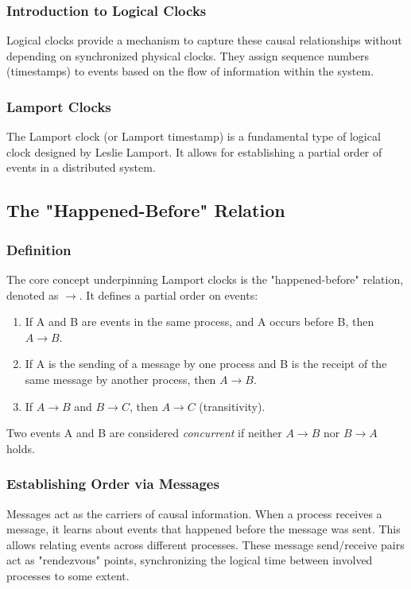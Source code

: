 \subsubsection{Introduction to Logical Clocks}
Logical clocks provide a mechanism to capture these causal relationships without depending on synchronized physical clocks. They assign sequence numbers (timestamps) to events based on the flow of information within the system.

\subsubsection{Lamport Clocks}
The Lamport clock (or Lamport timestamp) is a fundamental type of logical clock designed by Leslie Lamport. It allows for establishing a partial order of events in a distributed system.

\subsection{The "Happened-Before" Relation}

\subsubsection{Definition}
The core concept underpinning Lamport clocks is the "happened-before" relation, denoted as \( \rightarrow \). It defines a partial order on events:
\begin{enumerate}[label=\roman*), noitemsep]
    \item If A and B are events in the same process, and A occurs before B, then \( A \rightarrow B \).
    \item If A is the sending of a message by one process and B is the receipt of the same message by another process, then \( A \rightarrow B \).
    \item If \( A \rightarrow B \) and \( B \rightarrow C \), then \( A \rightarrow C \) (transitivity).
\end{enumerate}
Two events A and B are considered \textit{concurrent} if neither \( A \rightarrow B \) nor \( B \rightarrow A \) holds.

\subsubsection{Establishing Order via Messages}
Messages act as the carriers of causal information. When a process receives a message, it learns about events that happened before the message was sent. This allows relating events across different processes. These message send/receive pairs act as "rendezvous" points, synchronizing the logical time between involved processes to some extent.

